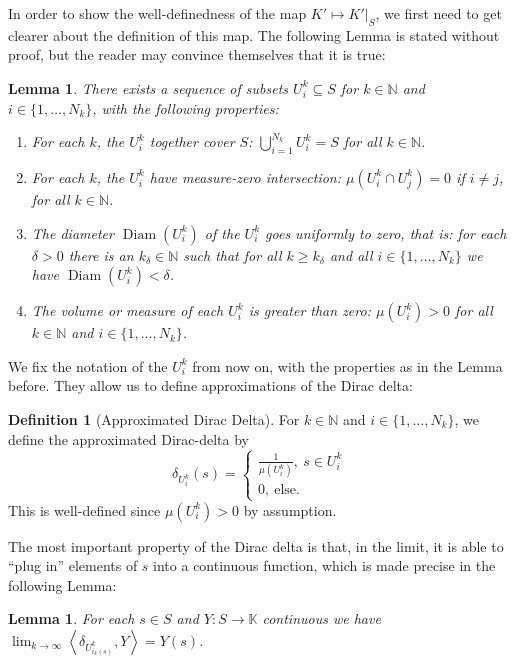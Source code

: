 \documentclass[12pt, a4paper]{article}
\theoremstyle{plain}
\newtheorem{lem}[pro]{Lemma}
\theoremstyle{definition}
\newtheorem{dfn}[pro]{Definition}
\theoremstyle{remark}
\newcommand{\N}{\mathds{N}}
\newcommand{\K}{\mathds{K}}
\DeclareMathOperator{\diam}{Diam}
\begin{document}
In order to show the well-definedness of the map $K' \mapsto K'|_S$, we first need to get clearer about the definition of this map. The following Lemma is stated without proof, but the reader may convince themselves that it is true:

\begin{lem}
There exists a sequence of subsets $U_i^k \subseteq S$ for $k \in \N$ and $i \in \{1, \dots, N_k\}$, with the following properties:
\begin{enumerate}
\item For each $k$, the $U_i^k$ together cover $S$: $\bigcup_{i = 1}^{N_k} U_i^k = S$ for all $k \in \N$.
\item For each $k$, the $U_i^k$ have measure-zero intersection: $\mu\left(U_i^k \cap U_j^k\right) = 0$ if $i \neq j$, for all $k \in \N$.
\item The diameter $\diam(U_i^k)$ of the $U_i^k$ goes uniformly to zero, that is: for each $\delta > 0$ there is an $k_\delta \in \N$ such that for all $k \geq k_\delta$ and all $i \in \{1, \dots, N_k\}$ we have $\diam(U_i^k) < \delta$. 
\item The volume or measure of each $U_i^k$ is greater than zero: $\mu(U_i^k) > 0$ for all $k \in \N$ and $i \in \{1, \dots, N_k\}$.
\end{enumerate}
\end{lem}

We fix the notation of the $U_i^k$ from now on, with the properties as in the Lemma before. They allow us to define approximations of the Dirac delta:

\begin{dfn}[Approximated Dirac Delta]
For $k \in \N$ and $i \in \{1, \dots, N_k\}$, we define the approximated Dirac-delta by
\begin{equation*}
\delta_{U_i^k}(s) = \begin{cases}
\frac{1}{\mu(U_i^k)}, \ s \in U_i^k \\
0, \ \text{else}.
\end{cases}
\end{equation*}
This is well-defined since $\mu(U_i^k) > 0$ by assumption.
\end{dfn}

The most important property of the Dirac delta is that, in the limit, it is able to ``plug in'' elements of $s$ into a continuous function, which is made precise in the following Lemma:

\begin{lem}\label{delta_property}
For each $s \in S$ and $Y: S \to \K$ continuous we have $\lim_{k \to \infty} \left\langle \delta_{U_{i_k(s)}^k}, Y \right\rangle = Y(s)$.
\end{lem}
\end{document}
